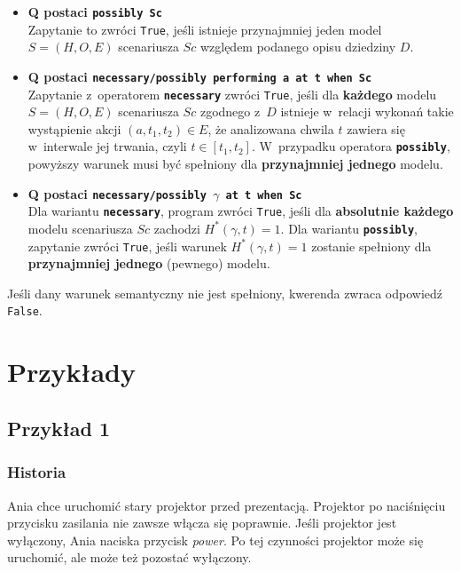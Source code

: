 \documentclass[12pt,a4paper]{article}
\begin{document}
\begin{itemize}
    \item \textbf{Q postaci \texttt{possibly Sc}} \\
    Zapytanie to zwróci \texttt{True}, jeśli istnieje przynajmniej jeden model $S=(H,O,E)$ scenariusza $Sc$ względem podanego opisu dziedziny $D$.

    \item \textbf{Q postaci \texttt{necessary/possibly performing a at t when Sc}} \\
    Zapytanie z~operatorem \textbf{\texttt{necessary}} zwróci \texttt{True}, jeśli dla \textbf{każdego} modelu $S=(H,O,E)$ scenariusza $Sc$ zgodnego z~$D$ istnieje w~relacji wykonań takie wystąpienie akcji $(a, t_1, t_2) \in E$, że analizowana chwila $t$ zawiera się w~interwale jej trwania, czyli $t \in [t_1, t_2]$. 
    W~przypadku operatora \textbf{\texttt{possibly}}, powyższy warunek musi być spełniony dla \textbf{przynajmniej jednego} modelu.

    \item \textbf{Q postaci \texttt{necessary/possibly $\gamma$ at t when Sc}} \\
    Dla wariantu \textbf{\texttt{necessary}}, program zwróci \texttt{True}, jeśli dla \textbf{absolutnie każdego} modelu scenariusza $Sc$ zachodzi $H^{*}(\gamma,t)=1$. 
    Dla wariantu \textbf{\texttt{possibly}}, zapytanie zwróci \texttt{True}, jeśli warunek $H^{*}(\gamma,t)=1$ zostanie spełniony dla \textbf{przynajmniej jednego} (pewnego) modelu.
\end{itemize}

Jeśli dany warunek semantyczny nie jest spełniony, kwerenda zwraca odpowiedź \texttt{False}.


\section{Przykłady}

\subsection{Przykład 1}

\subsubsection*{Historia}

Ania chce uruchomić stary projektor przed prezentacją. Projektor po naciśnięciu przycisku zasilania nie zawsze włącza się poprawnie. Jeśli projektor jest wyłączony, Ania naciska przycisk \emph{power}. Po tej czynności projektor może się uruchomić, ale może też pozostać wyłączony.
\end{document}
